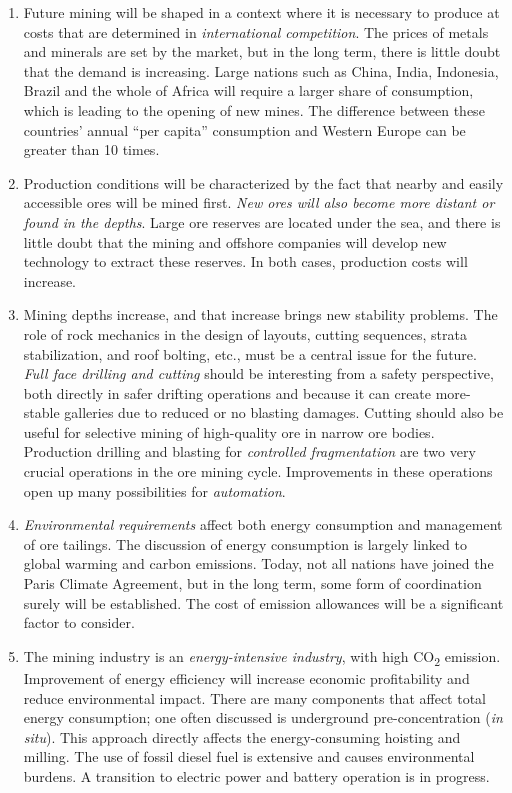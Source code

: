 \documentclass[
  12pt,
]{scrbook}
\begin{document}
\begin{enumerate}
\def\labelenumi{\arabic{enumi}.}
\item
  Future mining will be shaped in a context where it is necessary to produce at costs that are determined in \emph{international competition}. The prices of metals and minerals are set by the market, but in the long term, there is little doubt that the demand is increasing. Large nations such as China, India, Indonesia, Brazil and the whole of Africa will require a larger share of consumption, which is leading to the opening of new mines. The difference between these countries' annual ``per capita'' consumption and Western Europe can be greater than 10 times.
\item
  Production conditions will be characterized by the fact that nearby and easily accessible ores will be mined first. \emph{New ores will also become more distant or found in the depths}. Large ore reserves are located under the sea, and there is little doubt that the mining and offshore companies will develop new technology to extract these reserves. In both cases, production costs will increase.
\item
  Mining depths increase, and that increase brings new stability problems. The role of rock mechanics in the design of layouts, cutting sequences, strata stabilization, and roof bolting, etc., must be a central issue for the future. \emph{Full face drilling and cutting} should be interesting from a safety perspective, both directly in safer drifting operations and because it can create more-stable galleries due to reduced or no blasting damages. Cutting should also be useful for selective mining of high-quality ore in narrow ore bodies. Production drilling and blasting for \emph{controlled fragmentation} are two very crucial operations in the ore mining cycle. Improvements in these operations open up many possibilities for \emph{automation}.
\item
  \emph{Environmental requirements} affect both energy consumption and management of ore tailings. The discussion of energy consumption is largely linked to global warming and carbon emissions. Today, not all nations have joined the Paris Climate Agreement, but in the long term, some form of coordination surely will be established. The cost of emission allowances will be a significant factor to consider.
\item
  The mining industry is an \emph{energy-intensive industry}, with high CO\textsubscript{2} emission. Improvement of energy efficiency will increase economic profitability and reduce environmental impact. There are many components that affect total energy consumption; one often discussed is underground pre-concentration (\emph{in situ}). This approach directly affects the energy-consuming hoisting and milling. The use of fossil diesel fuel is extensive and causes environmental burdens. A transition to electric power and battery operation is in progress.

\end{enumerate}
\end{document}
